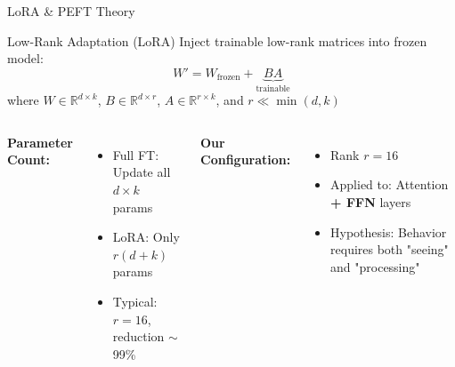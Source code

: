 \documentclass[aspectratio=169]{beamer}
\begin{document}
\begin{frame}{LoRA \& PEFT Theory}
\begin{block}{Low-Rank Adaptation (LoRA)}
Inject trainable low-rank matrices into frozen model:
\[
W' = W_{\text{frozen}} + \underbrace{B A}_{\text{trainable}}
\]
where $W \in \mathbb{R}^{d \times k}$, $B \in \mathbb{R}^{d \times r}$, $A \in \mathbb{R}^{r \times k}$, and $r \ll \min(d, k)$
\end{block}

\begin{columns}[T]
\textbf{Parameter Count:}
\begin{itemize}
    \item Full FT: Update all $d \times k$ params
    \item LoRA: Only $r(d + k)$ params
    \item Typical: $r = 16$, reduction $\sim$99\%
\end{itemize}

\textbf{Our Configuration:}
\begin{itemize}
    \item Rank $r = 16$
    \item Applied to: Attention \textbf{+ FFN} layers
    \item Hypothesis: Behavior requires both "seeing" and "processing"
\end{itemize}
\end{columns}
\end{frame}
\end{document}
